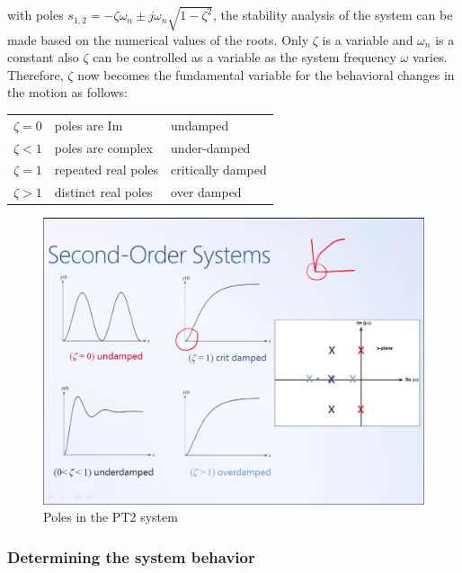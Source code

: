 with poles $s_{1,2} = -\zeta \omega_{n} \pm j \omega_{n} \sqrt{1 - \zeta^2}$, the stability analysis of the system can be made based on the numerical values of the roots. Only $\zeta$ is a variable and $\omega_{n}$ is a constant also $\zeta$ can be controlled as a variable as the system frequency $\omega$ varies. Therefore, $\zeta$ now becomes the fundamental variable for the behavioral changes in the motion as follows:
\begin{table}[h!]
	\centering
	\begin{tabular}{m{4em} m{8em} m{8em}}
		\toprule
		$\zeta = 0$ & poles are Im  & undamped \\
		$\zeta < 1$ & poles are complex & under-damped \\
		$\zeta = 1$ & repeated real poles & critically damped \\
		$\zeta > 1$ & distinct real poles & over damped \\ \bottomrule
	\end{tabular}
\end{table}
\begin{figure}[h!]
	\centering
	\includegraphics[width=\linewidth]{Bilder/Poles_PT2_system}
	\caption{Poles in the PT2 system}
\end{figure}

\subsubsection{Determining the system behavior} \label{Sec_PT2_system_properties}

